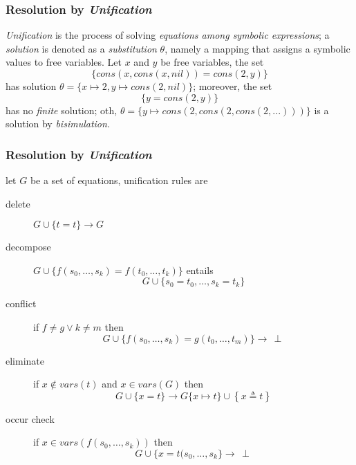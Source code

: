 \documentclass{beamer}
\begin{document}
\begin{frame}[fragile]
\frametitle{Resolution by \textit{Unification}}

\textit{Unification} is the process of solving \textit{equations among symbolic
expressions}; a \textit{solution} is denoted as a \textit{substitution}
$\theta$, namely a mapping that assigns a symbolic values to free variables.
\vfill
Let $x$ and $y$ be free variables, the set
$$\lbrace cons(x,cons(x,nil)) = cons(2,y)\rbrace$$
has solution $\theta = \lbrace x \mapsto 2, y \mapsto cons(2,nil) \rbrace$;
moreover, the set
$$ \lbrace y = cons(2,y) \rbrace $$
has no \textit{finite} solution; oth, $\theta = \lbrace y \mapsto
cons(2,cons(2,cons(2,...))) \rbrace$ is a solution by \textit{bisimulation}.
\end{frame}

\begin{frame}[fragile]
\frametitle{Resolution by \textit{Unification}}
let $G$ be a set of equations, unification rules are
\begin{description}
\item[delete] $G \cup \lbrace t = t \rbrace \rightarrow G$
\item[decompose] $G \cup \lbrace f(s_{0}, \ldots, s_{k}) = f(t_{0}, \ldots, t_{k})\rbrace$ entails
$$G \cup \lbrace s_{0}=t_{0},\ldots, s_{k}=t_{k} \rbrace$$
\item[conflict] if $f\neq g \vee k\neq m$ then $$G \cup \lbrace f(s_{0}, \ldots, s_{k}) = g(t_{0}, \ldots, t_{m})\rbrace \rightarrow \,\perp$$
\item[eliminate] if $x \not\in vars(t)$ and $x \in vars(G)$ then $$G \cup \lbrace x = t\rbrace \rightarrow G\lbrace x \mapsto t\rbrace \cup \left\lbrace x \triangleq t\right\rbrace $$
\item[occur check] if $x \in vars(f(s_{0},\ldots,s_{k}))$ then $$G \cup \lbrace x = t(s_{0}, \ldots, s_{k}\rbrace \rightarrow \,\perp$$
\end{description}
\end{frame}
\end{document}
